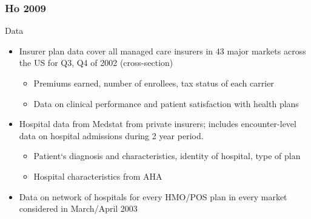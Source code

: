 \documentclass[aspectratio=169,11pt]{beamer}
\begin{document}
\begin{frame}
\frametitle{Ho 2009}

Data
\begin{itemize}
\item Insurer plan data cover all managed care insurers in 43 major markets across the US for Q3, Q4 of 2002 (cross-section)
\begin{itemize}
\item Premiums earned, number of enrollees, tax status of each carrier
\item Data on clinical performance and patient satisfaction with health plans
\end{itemize}
\item Hospital data from Medstat from private insurers; includes encounter-level data on hospital admissions during 2 year period.
\begin{itemize}
\item Patient`s diagnosis and characteristics, identity of hospital, type of plan
\item Hospital characteristics from AHA
\end{itemize}
\item Data on network of hospitals for every HMO/POS plan in every market considered in March/April 2003

\end{itemize}
\end{frame}
\end{document}
